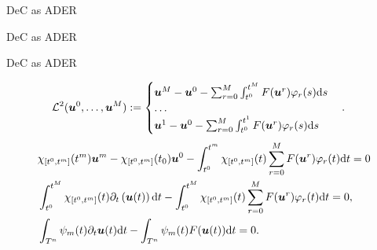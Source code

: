 \documentclass[aspectratio=169]{beamer}
\begin{document}
\begin{frame}{DeC as ADER}
	
\end{frame}

\begin{frame}{DeC as ADER}
	
\end{frame}

\begin{frame}{DeC as ADER}

\begin{align*}\label{eq:L2op}
\mathcal{L}^2(\boldsymbol{u}^0, \dots, \boldsymbol{u}^M) &:=
\begin{cases}
\boldsymbol{u}^M-\boldsymbol{u}^0 -\sum_{r=0}^M \int_{t^0}^{t^M} F(\boldsymbol{u}^r) \varphi_r(s) {\mathrm{d}{s}}\\
\dots\\
\boldsymbol{u}^1-\boldsymbol{u}^0 - \sum_{r=0}^M \int_{t^0}^{t^1} F(\boldsymbol{u}^r) \varphi_r(s) {\mathrm{d}{s}}
\end{cases}.
\end{align*}
\pause
\begin{align*}
&	\chi_{[t^0,t^{m}]}(t^m)\boldsymbol{u}^m-\chi_{[t^0,t^{m}]}(t_0)\boldsymbol{u}^0-  \int_{t^0}^{t^m} \chi_{[t^0,t^{m}]}(t)   \sum_{r=0}^M F(\boldsymbol{u}^r)\varphi_r(t) {\mathrm{d}{t}}=0\\
 &\int_{t^0}^{t^M} \chi_{[t^0,t^{m}]}(t) \partial_t \left(\boldsymbol{u}(t)\right) {\mathrm{d}{t}}-
 \int_{t^0}^{t^M} \chi_{[t^0,t^{m}]}(t) \sum_{r=0}^M  F(\boldsymbol{u}^r) \varphi_r(t) {\mathrm{d}{t}}=0,\\
 &\int_{T^n} \psi_{m}(t) \partial_t \boldsymbol{u}(t) {\mathrm{d}{t}}- \int_{T^n} \psi_{m}(t)
 F(\boldsymbol{u}(t)) {\mathrm{d}{t}}=0. 
\end{align*}
\end{frame}
\end{document}
